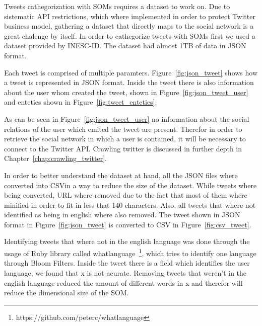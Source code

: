 
Tweets cathegorization with \ac{SOMs} requires a dataset to work on. Due to sistematic API restrictions, which where implemented in order to protect Twitter business model, gathering a dataset that directly maps to the social network is a great chalenge by itself. 
In order to cathegorize tweets with \ac{SOMs} first we used a dataset provided by INESC-ID. The dataset had almost 1TB of data in \ac{JSON} format.

Each tweet is comprised of multiple paramters. Figure~\ref{fig:json_tweet} shows how a tweet is represented in \ac{JSON} format. Inside the tweet there is also information about the user whom created the tweet, shown in Figure~\ref{fig:json_tweet_user} and enteties shown in Figure~\ref{fig:tweet_enteties}.

As can be seen in Figure~\ref{fig:json_tweet_user} no information about the social relations of the user which emited the tweet are present. Therefor in order to retrieve the social network in which a user is contained, it will be necessary to connect to the Twitter API. Crawling twitter is discussed in further depth in Chapter~\ref{chap:crawling_twitter}.  





In order to better understand the dataset at hand, all the \ac{JSON} files where converted into \ac{CSV}in a way to reduce the size of the dataset. While tweets where being converted, \ac{URL} where removed due to the fact that most of them where minified in order to fit in less that 140 characters. Also, all tweets that where not identified as being in english where also removed. The tweet shown in \ac{JSON} format in Figure~\ref{fig:json_tweet} is converted to \ac{CSV} in Figure~\ref{fig:csv_tweet}.

Identifying tweets that where not in the english language was done through the usage of Ruby library called whatlanguage~\footnote{https://github.com/peterc/whatlanguage}, which tries to identify one language through Bloom Filters. Inside the tweet there is a field which identifies the user language, we found that x is not acurate. Removing tweets that weren't in the english language reduced the amount of different words in x and therefor will reduce the dimensional size of the \ac{SOM}.

